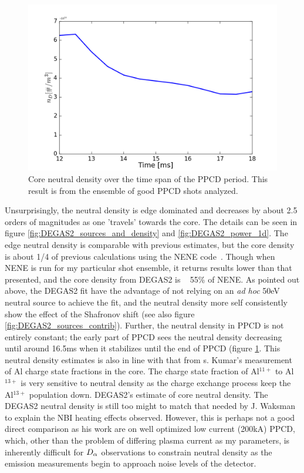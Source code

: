 \begin{figure}
    \centering
    \includegraphics[width=0.8\linewidth]{ion_transport_results/neutral_vs_time.png}
    \caption[Core neutral density over time]{Core neutral density over the time span of the PPCD period. This result is from the ensemble of good PPCD shots analyzed.}
    \label{fig:neutral_vs_time}
\end{figure}

Unsurprisingly, the neutral density is edge dominated and decreases by about 2.5 orders of magnitudes as one 'travels' towards the core. The details can be seen in figure \ref{fig:DEGAS2_sources_and_density} and \ref{fig:DEGAS2_power_1d}. The edge neutral density is comparable with previous estimates, but the core density is about 1/4 of previous calculations using the NENE code~\cite{Ei}. %
Though when NENE is run for my particular shot ensemble, it returns results lower than that presented, and the core density from DEGAS2 is ~ 55\% of NENE. As pointed out above, the DEGAS2 fit have the advantage of not relying on an \textit{ad hoc} 50eV neutral source to achieve the fit, and the neutral density more self consistently show the effect of the Shafronov shift (see also figure \ref{fig:DEGAS2_sources_contrib}). 
Further, the neutral density in PPCD is not entirely constant; the early part of PPCD sees the neutral density decreasing until around 16.5ms when it stabilizes until the end of PPCD (figure \ref{fig:neutral_vs_time}. This neutral density estimates is also in line with that from s. Kumar's measurement of Al charge state fractions in the core. The charge state fraction of Al$^{11+}$ to Al$^{13+}$ is very sensitive to neutral density as the charge exchange process keep the Al$^{13+}$ population down. DEGAS2's estimate of core neutral density. The DEGAS2 neutral density is still too might to match that needed by J. Waksman to explain the NBI heating effects observed. However, this is perhaps not a good direct comparison as his work are on well optimized low current (200kA) PPCD, which, other than the problem of differing plasma current as my parameters, is inherently difficult for $D_{\alpha}$ observations to constrain neutral density as the emission measurements begin to approach noise levels of the detector. 

